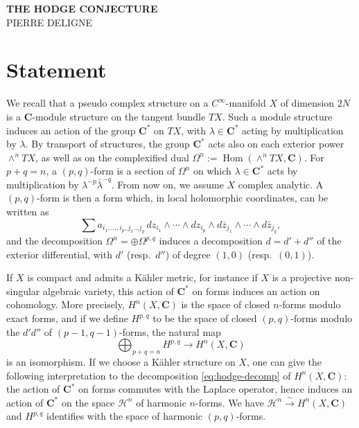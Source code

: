\documentclass[11pt,a4paper]{article}
\theoremstyle{plain}
\theoremstyle{definition}
\DeclareMathOperator{\Hom}{Hom}
\begin{document}
\begin{center}
{\Large\bfseries THE HODGE CONJECTURE}\\[0.5em]
{\large PIERRE DELIGNE}
\end{center}

\section{Statement}

We recall that a pseudo complex structure on a $C^{\infty}$-manifold $X$ of dimension $2N$ is a $\mathbf{C}$-module structure on the tangent bundle $TX$. Such a module structure induces an action of the group $\mathbf{C}^{*}$ on $TX$, with $\lambda \in \mathbf{C}^{*}$ acting by multiplication by $\lambda$. By transport of structures, the group $\mathbf{C}^{*}$ acts also on each exterior power $\wedge^{n} TX$, as well as on the complexified dual $\Omega^{n} := \Hom(\wedge^{n} TX, \mathbf{C})$. For $p+q=n$, a $(p,q)$-form is a section of $\Omega^{n}$ on which $\lambda \in \mathbf{C}^{*}$ acts by multiplication by $\lambda^{-p}\bar{\lambda}^{-q}$. From now on, we assume $X$ complex analytic. A $(p,q)$-form is then a form which, in local holomorphic coordinates, can be written as
\begin{equation*}
\sum a_{i_{1},\ldots,i_{p},j_{1}\ldots j_{q}} \, dz_{i_{1}} \wedge \cdots \wedge dz_{i_{p}} \wedge d\bar{z}_{j_{1}} \wedge \cdots \wedge d\bar{z}_{j_{q}},
\end{equation*}
and the decomposition $\Omega^{n} = \oplus \Omega^{p,q}$ induces a decomposition $d = d' + d''$ of the exterior differential, with $d'$ (resp.~$d''$) of degree $(1,0)$ (resp.~$(0,1)$).

If $X$ is compact and admits a K\"ahler metric, for instance if $X$ is a projective non-singular algebraic variety, this action of $\mathbf{C}^{*}$ on forms induces an action on cohomology. More precisely, $H^{n}(X,\mathbf{C})$ is the space of closed $n$-forms modulo exact forms, and if we define $H^{p,q}$ to be the space of closed $(p,q)$-forms modulo the $d'd''$ of $(p-1,q-1)$-forms, the natural map
\begin{equation}\label{eq:hodge-decomp}
\bigoplus_{p+q=n} H^{p,q} \longrightarrow H^{n}(X,\mathbf{C})
\end{equation}
is an isomorphism. If we choose a K\"ahler structure on $X$, one can give the following interpretation to the decomposition \eqref{eq:hodge-decomp} of $H^{n}(X,\mathbf{C})$: the action of $\mathbf{C}^{*}$ on forms commutes with the Laplace operator, hence induces an action of $\mathbf{C}^{*}$ on the space $\mathcal{H}^{n}$ of harmonic $n$-forms. We have $\mathcal{H}^{n} \xrightarrow{\sim} H^{n}(X,\mathbf{C})$ and $H^{p,q}$ identifies with the space of harmonic $(p,q)$-forms.
\end{document}
